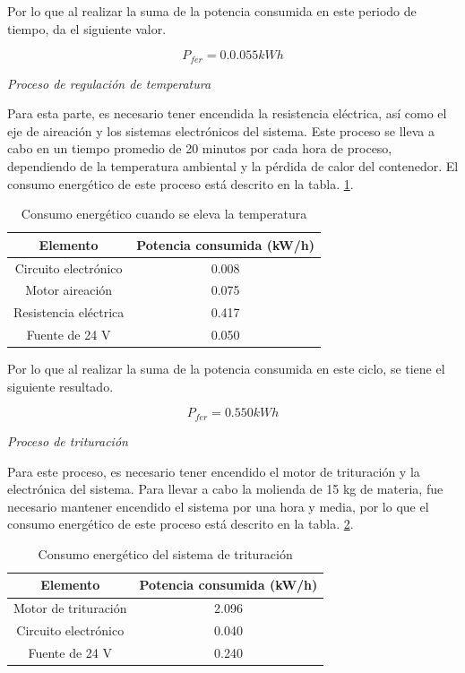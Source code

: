 Por lo que al realizar la suma de la potencia consumida en este periodo de tiempo, da el siguiente valor.

\begin{equation*}
    P_{fer} = 0.0.055   kWh
\end{equation*}

\textit{Proceso de regulación de temperatura}

Para esta parte, es necesario tener encendida la resistencia eléctrica, así como el eje de aireación y los sistemas electrónicos del sistema. Este proceso se lleva a cabo en un tiempo promedio de 20 minutos por cada hora de proceso, dependiendo de la temperatura ambiental y la pérdida de calor del contenedor. El consumo energético de este proceso está descrito en la tabla. \ref{tab:Temp_elec}.

\begin{table}
    \centering
\caption{Consumo energético cuando se eleva la temperatura}
\label{tab:Temp_elec}
    \begin{tabular}{|c|c|} \hline 
         Elemento&  Potencia consumida (kW/h)\\ \hline 
         Circuito electrónico&  0.008\\ \hline 
 Motor aireación&0.075\\ \hline 
 Resistencia eléctrica&0.417\\ \hline 
         Fuente de 24 V&  0.050\\\hline
    \end{tabular}
    
    
\end{table}

Por lo que al realizar la suma de la potencia consumida en este ciclo, se tiene el siguiente resultado.

\begin{equation*}
    P_{fer} = 0.550   kWh
\end{equation*}

\textit{Proceso de trituración}

Para este proceso, es necesario tener encendido el motor de trituración y la electrónica del sistema. Para llevar a cabo la molienda de 15 kg de materia, fue necesario mantener encendido el sistema por una hora y media, por lo que el consumo energético de este proceso está descrito en la tabla. \ref{tab:Tritu_cons}.

\begin{table}
    \centering
\caption{Consumo energético del sistema de trituración}
\label{tab:Tritu_cons}
    \begin{tabular}{|c|c|} \hline 
         Elemento&  Potencia consumida (kW/h)\\ \hline 
         Motor de trituración&  2.096\\ \hline 
         Circuito electrónico&0.040\\ \hline 
         Fuente de 24 V&  0.240\\\hline
    \end{tabular}
    
    
\end{table}

